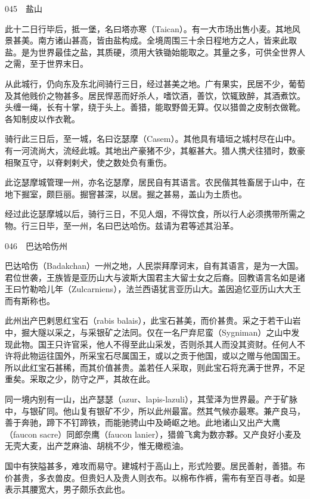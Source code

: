 \documentclass[12pt,UTF8]{ctexbook}
\begin{document}
045　盐山

此十二日行毕后，抵一堡，名曰塔亦寒（Taican）。有一大市场出售小麦。其地风景甚美。南方诸山甚高，皆由盐构成。全境周围三十余日程地方之人，皆来此取盐。是为世界最佳之盐，其质硬，须用大铁锄始能取之。其量之多，可供全世界人之需，至于世界末日。

从此城行，仍向东及东北间骑行三日，经过甚美之地。广有果实，民居不少，葡萄及其他贱价之物甚多。居民悍恶而好杀人，嗜饮酒，善饮，饮辄致醉，其酒煮饮。头缠一绳，长有十掌，绕于头上。善猎，能取野兽无算。仅以猎兽之皮制衣做靴。各知制皮以作衣靴。

骑行此三日后，至一城，名曰讫瑟摩（Casem）。其他具有墙垣之城村尽在山中。有一河流尚大，流经此城。其地出产豪猪不少，其躯甚大。猎人携犬往猎时，数豪相聚互守，以脊剌剌犬，使之数处负有重伤。

此讫瑟摩城管理一州，亦名讫瑟摩，居民自有其语言。农民偕其牲畜居于山中，在地下掘室，颇巨丽。掘窨甚深，以居。掘之甚易，盖山为土质也。

经过此讫瑟摩城以后，骑行三日，不见人烟，不得饮食，所以行人必须携带所需之物。行三日毕，至一州，名曰巴达哈伤。兹请为君等述其沿革。





046　巴达哈伤州

巴达哈伤（Badakchan）一州之地，人民崇拜摩诃末，自有其语言，是为一大国。君位世袭，王族皆是亚历山大与波斯大国君主大留士女之后裔。回教语言名如是诸王曰竹勒哈儿年（Zulcarniens），法兰西语犹言亚历山大。盖因追忆亚历山大大王而有斯称也。

此州出产巴剌思红宝石（rabis balais），此宝石甚美，而价甚贵。采之于若干山岩中，掘大隧以采之，与采银矿之法同。仅在一名尸弃尼蛮（Sygniman）之山中发现此物。国王只许官采，他人不得至此山采发，否则杀其人而没其资财。任何人不许将此物运往国外，所采宝石尽属国王，或以之贡于他国，或以之赠与他国国王。所以此红宝石甚稀，而其价值甚贵。盖若任人采取，则此宝石将充满于世界，不足重矣。采取之少，防守之严，其故在此。

同一境内别有一山，出产瑟瑟（azur、lapis-lazuli），其莹泽为世界最。产于矿脉中，与银矿同。他山复有银矿不少，所以此州最富。然其气候亦最寒。兼产良马，善于奔驰，蹄下不钉蹄铁，而能驰骋山中及崎岖之地。此地诸山又出产大鹰（faucon sacre）同郎奈鹰（faucon lanier），猎兽飞禽为数亦夥。又产良好小麦及无壳大麦，出产芝麻油、胡桃不少，惟无橄榄油。

国中有狭隘甚多，难攻而易守。建城村于高山上，形式险要。居民善射，善猎。布价甚贵，多衣兽皮。但贵妇人及贵人则衣布。以棉布作裤，需布有至百寻者。如是表示其腰宽大，男子颇乐衣此也。
\end{document}
